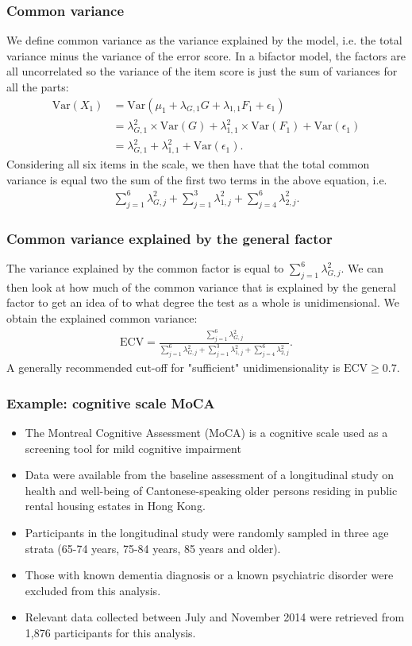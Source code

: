 \documentclass[compress]{beamer}
\begin{document}
\begin{frame}[fragile]
\frametitle{Common variance}
We define common variance as the variance explained by the model, i.e. the total variance minus the variance of the error score. In a bifactor model, the factors are all uncorrelated so the variance of the item score is just the sum of variances for all the parts:
\begin{align*}
\text{Var}(X_1) &= \text{Var}(\mu_1 + \lambda_{G,1}G+ \lambda_{1,1} F_1+ \epsilon_1) \\
&= \lambda_{G,1}^2 \times \text{Var}(G) + \lambda_{1,1}^2 \times \text{Var}(F_1) + \text{Var}(\epsilon_1)\\
&= \lambda_{G,1}^2 + \lambda_{1,1}^2 +  \text{Var}(\epsilon_1).
\end{align*}
Considering all six items in the scale, we then have that the total common variance is equal two the sum of the first two terms in the above equation, i.e.
\begin{align*}
\sum_{j=1}^6\lambda_{G,j}^2 + \sum_{j=1}^3\lambda_{1,j}^2 + \sum_{j=4}^6\lambda_{2,j}^2.
\end{align*}
\end{frame}

\begin{frame}[fragile]
\frametitle{Common variance explained by the general factor}
The variance explained by the common factor is equal to $\sum_{j=1}^6\lambda_{G,j}^2$. We can then look at how much of the common variance that is explained by the general factor to get an idea of to what degree the test as a whole is unidimensional. We obtain the explained common variance: 
\begin{align*}
\text{ECV} = \frac{\sum_{j=1}^6\lambda_{G,j}^2}{\sum_{j=1}^6\lambda_{G,j}^2 + \sum_{j=1}^3\lambda_{1,j}^2 + \sum_{j=4}^6\lambda_{2,j}^2}.
\end{align*}
A generally recommended cut-off for "sufficient" unidimensionality is $\text{ECV} \geq 0.7$.
\end{frame}

\begin{frame}[fragile]
\frametitle{Example: cognitive scale MoCA}
\begin{itemize}
\item The Montreal Cognitive Assessment (MoCA) is a cognitive scale used as a screening tool for mild cognitive impairment
\item Data were available from the baseline assessment of a longitudinal study on health and well-being of Cantonese-speaking older persons residing in public rental housing estates in Hong Kong.
\item Participants in the longitudinal study were randomly sampled in three age strata (65-74 years, 75-84 years, 85 years and older).
\item Those with known dementia diagnosis or a known psychiatric disorder were excluded from this analysis.
\item Relevant data collected between July and November 2014 were retrieved from 1,876 participants for this analysis.
\end{itemize}
\end{frame}
\end{document}

